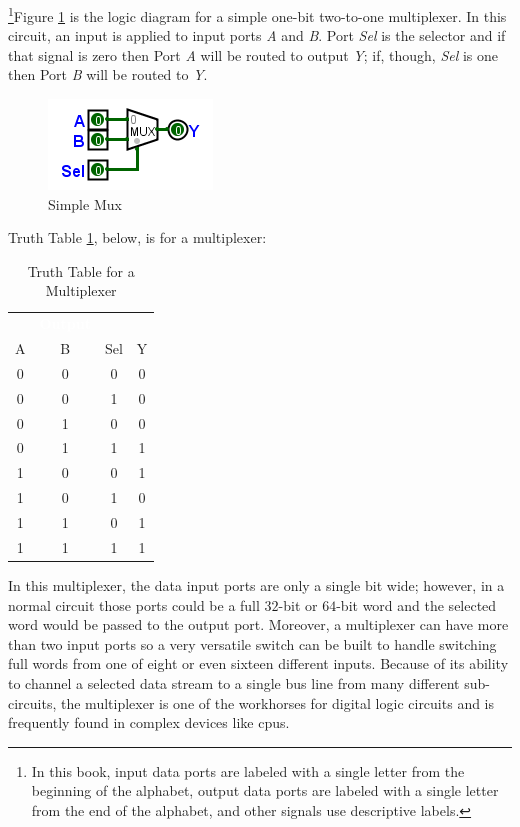 \footnote{In this book, input data ports are labeled with a single letter from the beginning of the alphabet, output data ports are labeled with a single letter from the end of the alphabet, and other signals use descriptive labels.}Figure \ref{fig:08_01} is the logic diagram for a simple one-bit two-to-one multiplexer. In this circuit, an input is applied to input ports \emph{A} and \emph{B}. Port \emph{Sel} is the selector and if that signal is zero then Port \emph{A} will be routed to output \emph{Y}; if, though, \emph{Sel} is one then Port \emph{B} will be routed to \emph{Y}.

\begin{figure}[H]
	\centering
	\includegraphics[width=\maxwidth{.95\linewidth}]{gfx/08_01}
	\caption{Simple Mux}
	\label{fig:08_01}
\end{figure}

Truth Table \ref{tab:08_01}, below, is for a multiplexer:

\begin{table}[H]
  \sffamily
  \newcommand{\head}[1]{\textcolor{white}{\textbf{#1}}}    
  \begin{center}
    \begin{tabular}{cc|cc} 
      \rowcolor{black!75}
      \multicolumn{3}{c}{\head{Inputs}} & \head{Output} \\
      A & B & Sel & Y \\
      \hline
      0 & 0 & 0 & 0 \\
      0 & 0 & 1 & 0 \\
      0 & 1 & 0 & 0 \\
      0 & 1 & 1 & 1 \\
      1 & 0 & 0 & 1 \\
      1 & 0 & 1 & 0 \\
      1 & 1 & 0 & 1 \\
      1 & 1 & 1 & 1 
    \end{tabular}
  \end{center}
  \caption{Truth Table for a Multiplexer}
  \label{tab:08_01}
\end{table}

In this multiplexer, the data input ports are only a single bit wide; however, in a normal circuit those ports could be a full $ 32 $-bit or $ 64 $-bit word and the selected word would be passed to the output port. Moreover, a multiplexer can have more than two input ports so a very versatile switch can be built to handle switching full words from one of eight or even sixteen different inputs. Because of its ability to channel a selected data stream to a single bus line from many different sub-circuits, the multiplexer is one of the workhorses for digital logic circuits and is frequently found in complex devices like \glspl{cpu}.
 
